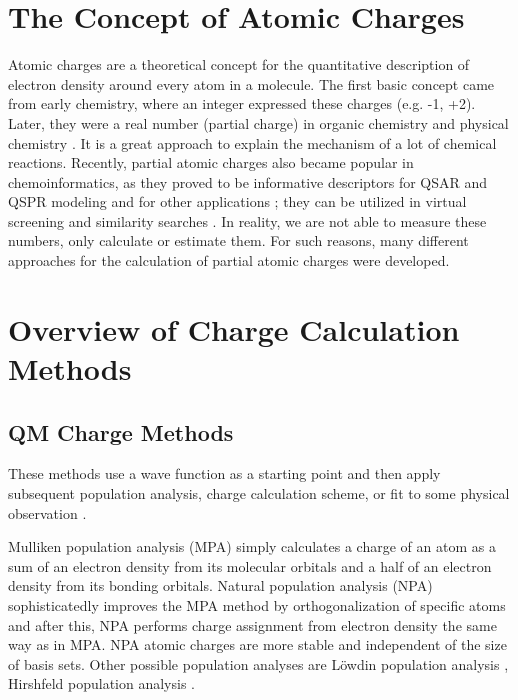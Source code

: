 \section{The Concept of Atomic Charges}

Atomic charges are a theoretical concept for the quantitative description of
electron density around every atom in a molecule. The first basic concept came
from early chemistry, where an integer expressed these charges (e.g. -1, +2).
Later, they were a real number (partial charge) in organic chemistry and
physical chemistry \cite{Atkins2011}. It is a great approach to explain the
mechanism of a lot of chemical reactions. Recently, partial atomic charges also
became popular in chemoinformatics, as they proved to be informative descriptors
for QSAR and QSPR modeling \cite{Chaves2006, Gross2002} and for other
applications \cite{Moller2005, Zhang2006, Ghafourian2000}; they can be utilized
in virtual screening \cite{Galvez1994, Stalke2011} and similarity
searches \cite{Lyne2002, Bissantz2000}. In reality, we are not able to measure
these numbers, only calculate or estimate them. For such reasons, many different
approaches for the calculation of partial atomic charges were developed.

\section{Overview of Charge Calculation Methods}

\subsection{QM Charge Methods}

These methods use a wave function as a starting point and then apply subsequent
population analysis, charge calculation scheme, or fit to some physical
observation \cite{spark}. 

Mulliken population analysis (MPA) \cite{Mulliken1955, Mulliken1955a} simply
calculates a charge of an atom as a sum of an electron density from its
molecular orbitals and a half of an electron density from its bonding orbitals.
Natural population analysis (NPA) \cite{Reed1983, Reed1985} sophisticatedly
improves the MPA method by orthogonalization of specific atoms and after this,
NPA performs charge assignment from electron density the same way as in MPA.
NPA atomic charges are more stable and independent of the size of basis sets.
Other possible population analyses are Löwdin population
analysis \cite{Lowdin1950}, Hirshfeld population analysis \cite{Hirshfeld1977}.

